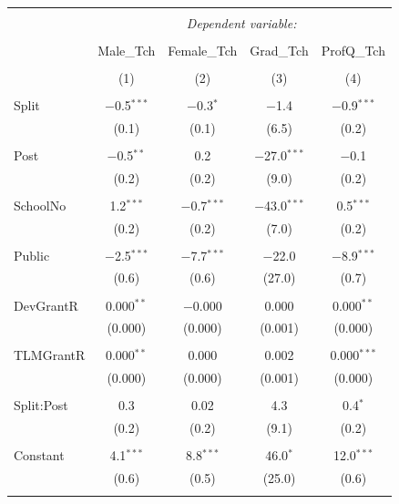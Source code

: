 \documentclass[12pt, a4paper]{article}
\begin{document}
\begin{table}[!htbp] \centering 
  \caption{} 
  \label{} 
\begin{tabular}{@{\extracolsep{5pt}}lcccc} 
\\[-1.8ex]\hline 
\hline \\[-1.8ex] 
 & \multicolumn{4}{c}{\textit{Dependent variable:}} \\ 
\cline{2-5} 
\\[-1.8ex] & Male\_Tch & Female\_Tch & Grad\_Tch & ProfQ\_Tch \\ 
\\[-1.8ex] & (1) & (2) & (3) & (4)\\ 
\hline \\[-1.8ex] 
 Split & $-$0.5$^{***}$ & $-$0.3$^{*}$ & $-$1.4 & $-$0.9$^{***}$ \\ 
  & (0.1) & (0.1) & (6.5) & (0.2) \\ 
  & & & & \\ 
 Post & $-$0.5$^{**}$ & 0.2 & $-$27.0$^{***}$ & $-$0.1 \\ 
  & (0.2) & (0.2) & (9.0) & (0.2) \\ 
  & & & & \\ 
 SchoolNo & 1.2$^{***}$ & $-$0.7$^{***}$ & $-$43.0$^{***}$ & 0.5$^{***}$ \\ 
  & (0.2) & (0.2) & (7.0) & (0.2) \\ 
  & & & & \\ 
 Public & $-$2.5$^{***}$ & $-$7.7$^{***}$ & $-$22.0 & $-$8.9$^{***}$ \\ 
  & (0.6) & (0.6) & (27.0) & (0.7) \\ 
  & & & & \\ 
 DevGrantR & 0.000$^{**}$ & $-$0.000 & 0.000 & 0.000$^{**}$ \\ 
  & (0.000) & (0.000) & (0.001) & (0.000) \\ 
  & & & & \\ 
 TLMGrantR & 0.000$^{**}$ & 0.000 & 0.002 & 0.000$^{***}$ \\ 
  & (0.000) & (0.000) & (0.001) & (0.000) \\ 
  & & & & \\ 
 Split:Post & 0.3 & 0.02 & 4.3 & 0.4$^{*}$ \\ 
  & (0.2) & (0.2) & (9.1) & (0.2) \\ 
  & & & & \\ 
 Constant & 4.1$^{***}$ & 8.8$^{***}$ & 46.0$^{*}$ & 12.0$^{***}$ \\ 
  & (0.6) & (0.5) & (25.0) & (0.6) \\ 
  & & & & \\ 

\end{tabular}
\end{table}
\end{document}
